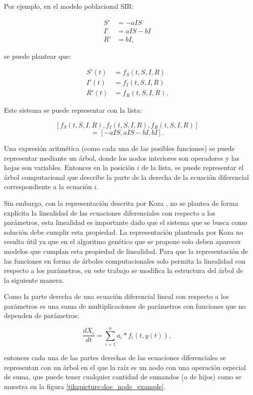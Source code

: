 Por ejemplo, en el modelo poblacional SIR:

\begin{align*}
    S' & = - aIS    \\
    I' & = aIS - bI \\
    R' & = bI,
\end{align*}

se puede plantear que:

\begin{align*}
    S'(t) & = f_S(t, S, I, R)  \\
    I'(t) & = f_I(t, S, I, R)  \\
    R'(t) & = f_R(t, S, I, R).
\end{align*}

Este sistema se puede representar con la lista:

$$[f_S(t, S, I, R), f_I(t, S, I, R), f_R(t, S, I, R)]$$
$$= [-aIS, aIS - bI, bI].$$

Una expresión aritmética (como cada una de las posibles funciones) se puede representar mediante un árbol, donde los nodos interiores son operadores y las hojas son variables. Entonces en la posición $i$ de la lista, se puede representar el árbol computacional que describe la parte de la derecha de la ecuación diferencial correspondiente a la ecuación $i$.

Sin embargo, con la representación descrita por Koza \cite{zelinka2005analytic}, no se plantea de forma explícita la linealidad de las ecuaciones diferenciales con respecto a los parámetros, esta linealidad es importante dado que el sistema que se busca como solución debe cumplir esta propiedad. La representación planteada por Koza no resulta útil ya que en el algoritmo genético que se propone solo deben aparecer modelos que cumplan esta propiedad de linealidad. Para que la representación de las funciones en forma de árboles computacionales solo permita la linealidad con respecto a los parámetros, en este trabajo se modifica la estructura del árbol de la siguiente manera.

Como la parte derecha de una ecuación diferencial lineal con respecto a los parámetros es una suma de multiplicaciones de parámetros con funciones que no dependen de parámetros:

$$\frac{dX_i}{dt} = \sum_{i=1}^{n} a_i * f_i(t, y(t)),$$

entonces cada una de las partes derechas de las ecuaciones diferenciales se representan con un árbol en el que la raíz es un nodo con una operación especial de suma, que puede tener cualquier cantidad de sumandos (o de hijos) como se muestra en la figura \ref{tikzpicture:doe_node_example}.

